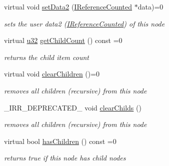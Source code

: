 \begin{DoxyCompactItemize}
virtual void \hyperlink{classirr_1_1gui_1_1IGUITreeViewNode_aa837350d9f71ca6b3dae25678f17bd21}{set\+Data2} (\hyperlink{classirr_1_1IReferenceCounted}{I\+Reference\+Counted} $\ast$data)=0
\begin{DoxyCompactList}\small\item\em sets the user data2 (\hyperlink{classirr_1_1IReferenceCounted}{I\+Reference\+Counted}) of this node \end{DoxyCompactList}\item 
\mbox{\label{classirr_1_1gui_1_1IGUITreeViewNode_a8b9aeb50e43a76b27187aa5c0d370f23}} 
virtual \hyperlink{namespaceirr_a0416a53257075833e7002efd0a18e804}{u32} \hyperlink{classirr_1_1gui_1_1IGUITreeViewNode_a8b9aeb50e43a76b27187aa5c0d370f23}{get\+Child\+Count} () const =0
\begin{DoxyCompactList}\small\item\em returns the child item count \end{DoxyCompactList}\item 
\mbox{\label{classirr_1_1gui_1_1IGUITreeViewNode_a0bc4702930d1ddb25b895c7176f5f459}} 
virtual void \hyperlink{classirr_1_1gui_1_1IGUITreeViewNode_a0bc4702930d1ddb25b895c7176f5f459}{clear\+Children} ()=0
\begin{DoxyCompactList}\small\item\em removes all children (recursive) from this node \end{DoxyCompactList}\item 
\+\_\+\+I\+R\+R\+\_\+\+D\+E\+P\+R\+E\+C\+A\+T\+E\+D\+\_\+ void \hyperlink{classirr_1_1gui_1_1IGUITreeViewNode_a6c431404c8e36eb565f033c1e1dce247}{clear\+Childs} ()
\begin{DoxyCompactList}\small\item\em removes all children (recursive) from this node \end{DoxyCompactList}\item 
\mbox{\label{classirr_1_1gui_1_1IGUITreeViewNode_a64244b92443fefbd06c910daf5db3c5f}} 
virtual bool \hyperlink{classirr_1_1gui_1_1IGUITreeViewNode_a64244b92443fefbd06c910daf5db3c5f}{has\+Children} () const =0
\begin{DoxyCompactList}\small\item\em returns true if this node has child nodes \end{DoxyCompactList}\item 

\end{DoxyCompactItemize}
